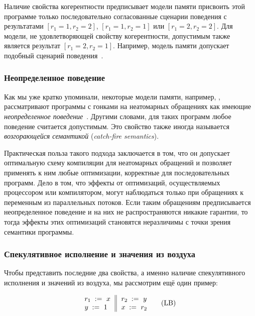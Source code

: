 Наличие свойства когерентности предписывает модели памяти 
присвоить этой программе только последовательно 
согласованные сценарии поведения с результатами
${[r_1=1, r_2=2]}$, ${[r_1=1, r_2=1]}$ или ${[r_1=2, r_2=2]}$.
Для модели, не удовлетворяющей свойству когерентности, 
допустимым также является результат ${[r_1=2, r_2=1]}$.
Например, модель памяти \Java допускает подобный сценарий поведения~\cite{Manson-al:POPL05}.

\subsubsection{Неопределенное поведение}
\label{sec:background:ub}

Как мы уже кратко упоминали, некоторые модели памяти, например, \CPP, рассматривают программы с гонками 
на неатомарных обращениях как имеющие 
\emph{неопределенное поведение}~\cite{Boehm-Adve:PLDI08}.
Другими словами, для таких программ любое поведение считается допустимым. 
Это свойство также иногда называется 
\emph{возгорающейся семантикой} (\emph{catch-fire semantics}).
 
Практическая польза такого подхода заключается в том,
что он допускает оптимальную схему компиляции для 
неатомарных обращений и позволяет применять к ним 
любые оптимизации, корректные для последовательных программ.
Дело в том, что эффекты от оптимизаций, осуществляемых процессором или компилятором, могут наблюдаться только при обращениях к переменным из параллельных потоков. 
Если таким обращениям предписывается неопределенное поведение и на них 
не распространяются никакие гарантии, то тогда эффекты этих оптимизаций 
становятся неразличимы с точки зрения семантики программы. 
 
\subsubsection{Спекулятивное исполнение и значения из воздуха}
\label{sec:background:oota}

Чтобы представить последние два свойства, 
а именно наличие спекулятивного исполнения и значений из воздуха, 
мы рассмотрим ещё один пример:

\begin{equation*}
\inarrII{
  \readInst{}{r_1}{x}     \\
  \writeInst{}{y}{1}      \\
}{
  \readInst{}{r_2}{y}     \\
  \writeInst{}{x}{r_2}    \\
}
\tag{LB}\label{ex:lb}
\end{equation*}

